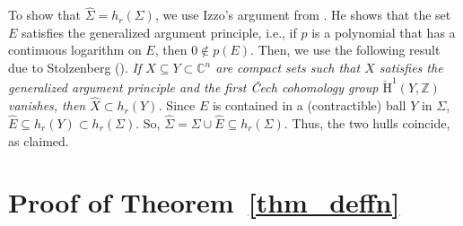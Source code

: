 \documentclass[10pt]{amsart}
\numberwithin{equation}{section}
\theoremstyle{definition}
\theoremstyle{definition}
\theoremstyle{plain}
\newcommand{\Cn}{\mathbb{C}^n}
\begin{document}
To show that $\widehat{\Sigma}=h_r(\Sigma)$, we use Izzo's argument from \cite[Section 3]{Iz18}. He shows that the set $E$ satisfies the generalized argument principle, i.e., if $p$ is a polynomial that has a continuous logarithm on $E$, then $0\notin p(E)$. Then, we use the following result due to Stolzenberg (\cite{St63}). {\em If $X\subseteq Y\subset\Cn$ are compact sets such that $X$ satisfies the generalized argument principle and the first {\v C}ech cohomology group $\check{\mathrm{H}}^1(Y,\mathbb{Z})$ vanishes, then $\widehat X\subset h_r(Y)$.} Since $E$ is contained in a (contractible) ball $Y$ in $\Sigma$, $\widehat E\subseteq h_r(Y)\subset h_r(\Sigma)$. So, $\widehat{\Sigma}= \Sigma\cup\widehat{E}\subseteq h_r(\Sigma)$. Thus, the two hulls coincide, as claimed. 
\section{Proof of Theorem~\ref{thm_deffn}}\label{sec_deffn}
\end{document}
